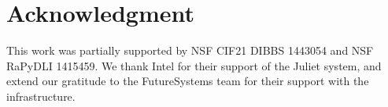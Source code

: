 \documentclass[10pt, conference, compsocconf]{IEEEtran}
\begin{document}
\section*{Acknowledgment}
This work was partially supported by NSF CIF21 DIBBS 1443054 and NSF RaPyDLI 1415459. We thank Intel  for their support of the Juliet system, and extend our gratitude to the FutureSystems team for their support with the infrastructure. 



%
%
%


% 

\balance
{}



\end{document}
